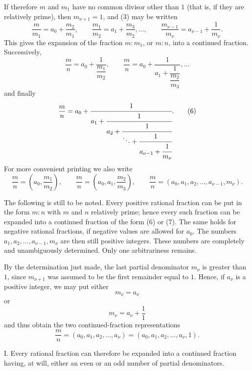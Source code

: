\documentclass[11pt]{article}
\begin{document}
If therefore $m$ and $m_1$ have no common divisor other than $1$ (that is, if they are relatively prime), then $m_{\nu+1}=1$, and (3) may be written
\begin{equation}
        \frac{m}{m_1}=a_0+\frac{m_2}{m_1},\qquad
        \frac{m_1}{m_2}=a_1+\frac{m_3}{m_2},\ldots,\qquad
        \frac{m_{\nu-1}}{m_\nu}=a_{\nu-1}+\frac1{m_\nu}.
\tag{4}
\end{equation}
This gives the expansion of the fraction $m:m_1$, or $m:n$, into a continued fraction. Successively,
\begin{equation}
        \frac mn=a_0+\frac1{\dfrac{m_1}{m_2}},\qquad
        \frac mn=a_0+\frac1{a_1+\dfrac1{\dfrac{m_2}{m_3}}},\ldots
\tag{5}
\end{equation}
and finally
\begin{equation}
        \frac mn=a_0+\cfrac1{a_1+\cfrac1{a_2+\cfrac1{\ddots+\cfrac1{a_{\nu-1}+\cfrac1{m_\nu}}}}}.
\tag{6}
\end{equation}
For more convenient printing we also write
\begin{equation}
        \frac mn=\left(a_0,\frac{m_1}{m_2}\right),\qquad
        \frac mn=\left(a_0,a_1,\frac{m_2}{m_3}\right),
        \qquad
        \frac mn=(a_0,a_1,a_2,\ldots,a_{\nu-1},m_\nu).
\tag{7}
\end{equation}

The following is still to be noted. Every positive rational fraction can be put in the form $m:n$ with $m$ and $n$ relatively prime; hence every such fraction can be expanded into a continued fraction of the form (6) or (7). The same holds for negative rational fractions, if negative values are allowed for $a_0$. The numbers $a_1,a_2,\ldots,a_{\nu-1},m_\nu$ are then still positive integers. These numbers are completely and unambiguously determined. Only one arbitrariness remains.

By the determination just made, the last partial denominator $m_\nu$ is greater than $1$, since $m_{\nu+1}$ was assumed to be the first remainder equal to $1$. Hence, if $a_\nu$ is a positive integer, we may put either
\[
        m_\nu=a_\nu
\]
or
\[
        m_\nu=a_\nu+\frac11
\]
and thus obtain the two continued-fraction representations
\begin{equation}
        \frac mn=(a_0,a_1,a_2,\ldots,a_\nu)
        =(a_0,a_1,a_2,\ldots,a_\nu,1).
\tag{8}
\end{equation}

I. Every rational fraction can therefore be expanded into a continued fraction having, at will, either an even or an odd number of partial denominators.
\end{document}
